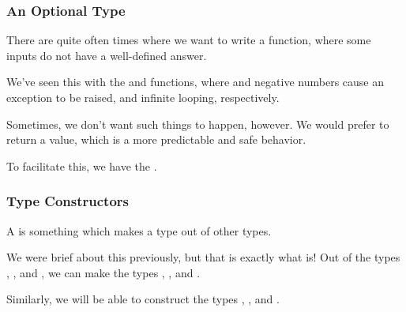 \documentclass[aspectratio=169]{beamer}
\begin{document}
\begin{frame}[fragile]
  \frametitle{An Optional Type}

  There are quite often times where we want to write a function, where some inputs
  do not have a well-defined answer.

  \pause
  \vspace{\fill}

  We've seen this with the  and  functions, where  and
  negative numbers cause an exception to be raised, and infinite looping, respectively.

  \pause
  \vspace{\fill}

  Sometimes, we don't want such things to happen, however. We would prefer to return
  a value, which is a more predictable and safe behavior.

  \pause
  \vspace{\fill}

  To facilitate this, we have the  .
\end{frame}

\begin{frame}[fragile]
  \frametitle{Type Constructors}

  A  is something which makes a type out of other types.

  \pause
  \vspace{\fill}

  We were brief about this previously, but that is exactly what  is!
  Out of the types , , and , we can make
  the types , , and .

  \pause
  \vspace{\fill}

  Similarly, we will be able to construct the types , ,
  and .
\end{frame}
\end{document}
